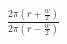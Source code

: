 \documentclass[preview]{standalone}
\begin{document}
\begin{center}
$\frac{2\pi(r+\frac{w}{2})}{2\pi(r-\frac{w}{2})}$
\end{center}
\end{document}
